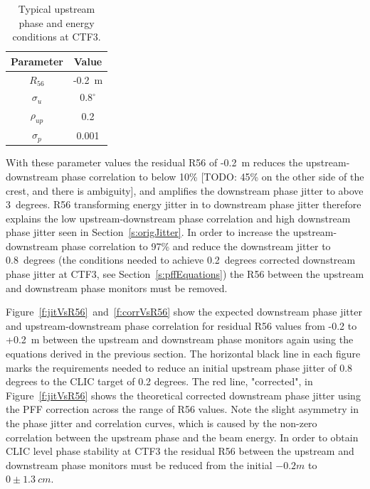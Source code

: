 \begin{table}
  \begin{center}
    \begin{tabular}{| c c |}
	   \hline
       Parameter & Value \\ \hline
       \(R_{56}\) & -0.2~m \\
       \(\sigma_u\) & \(0.8^\circ\) \\
       \(\rho_{up}\) & 0.2 \\
       \(\sigma_{p}\) & 0.001 \\ \hline
    \end{tabular}
    \caption{Typical upstream phase and energy conditions at CTF3.}
  	\label{t:r56Params}
  \end{center}
\end{table}

With these parameter values the residual R56 of -0.2~m reduces the upstream-downstream phase correlation to below 10\% [TODO: 45\% on the other side of the crest, and there is ambiguity], and amplifies the downstream phase jitter to above 3~degrees. R56 transforming energy jitter in to downstream phase jitter therefore explains the low upstream-downstream phase correlation and high downstream phase jitter seen in Section~\ref{s:origJitter}. In order to increase the upstream-downstream phase correlation to 97\% and reduce the downstream jitter to 0.8~degrees (the conditions needed to achieve 0.2~degrees corrected downstream phase jitter at CTF3, see Section~\ref{s:pffEquations}) the R56 between the upstream and downstream phase monitors must be removed.

Figure~\ref{f:jitVsR56}~and~\ref{f:corrVsR56} show the expected downstream phase jitter and upstream-downstream phase correlation for residual R56 values from -0.2 to +0.2~m between the upstream and downstream phase monitors again using the equations derived in the previous section. The horizontal black line in each figure marks the requirements needed to reduce an initial upstream phase jitter of 0.8 degrees to the CLIC target of 0.2 degrees. The red line, "corrected", in Figure~\ref{f:jitVsR56} shows the theoretical corrected downstream phase jitter using the PFF correction across the range of R56 values. Note the slight asymmetry in the phase jitter and correlation curves, which is caused by the non-zero correlation between the upstream phase and the beam energy. In order to obtain CLIC level phase stability at CTF3 the residual R56 between the upstream and downstream phase monitors must be reduced from the initial \(-0.2m\) to \(0\pm1.3~cm\).

